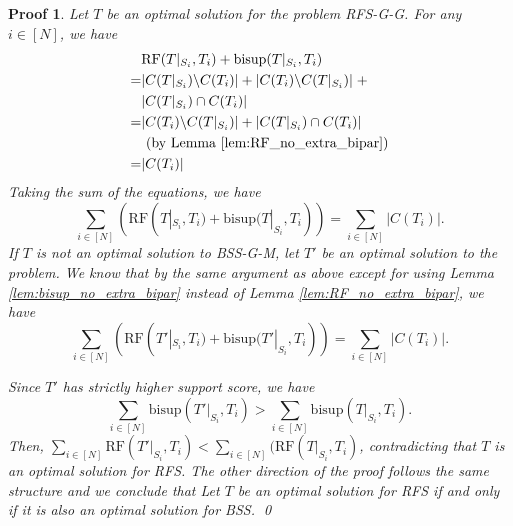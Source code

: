 \documentclass[twocolumn]{bmcart}%
\newcommand{\bs}{\mathrm{bisup}}
\newcommand{\RF}{\mathrm{RF}}
\newcommand{\bss}{\textsc{BSS}\xspace}
\newcommand{\rfs}{\textsc{RFS}\xspace}
\renewcommand{\G}{\textsc{G}\xspace}
\renewcommand{\M}{\textsc{M}\xspace}
\theoremstyle{mystyle}
\theoremstyle{proofstyle}
\newtheorem*{proof2}{Proof}
\newenvironment{proofnospace}{\begin{proof2}}{\qed \end{proof2}}
\begin{document}
\lemEquivalentProblemsGeneral*
\begin{proofnospace}
    Let $T$ be an optimal solution for the problem \rfs-\G-\G.
    For any $i \in [N]$, we have 
    \begin{align*}
        &\RF(T|_{S_i}, T_i) + \bs(T|_{S_i},T_i) \\ 
        =& |C(T|_{S_i})\backslash C(T_i)|   + |C(T_i)\backslash C(T|_{S_i})| \;+ \\   
         & |C(T|_{S_i}) \cap C(T_i)|\\
        =& |C(T_i)\backslash C(T|_{S_i})| + |C(T|_{S_i}) \cap C(T_i)| \\
        &\text{ (by Lemma \ref{lem:RF_no_extra_bipar})}\\
        =& |C(T_i)|
    \end{align*}
  Taking the sum of the equations, we have
  \[
    \sum_{i \in [N]} (\RF(T|_{S_i}, T_i) + \bs(T|_{S_i},T_i)) = \sum_{i \in [N]} |C(T_i)|.
  \]
  If $T$ is not an optimal solution to \bss-\G-\M, let $T'$ be an optimal solution to the problem. We know that by the same argument as above except for using Lemma \ref{lem:bisup_no_extra_bipar} instead of Lemma \ref{lem:RF_no_extra_bipar}, we have
    \[
    \sum_{i \in [N]} (\RF(T'|_{S_i}, T_i) + \bs(T'|_{S_i},T_i)) = \sum_{i \in [N]} |C(T_i)|.
  \]
  
  Since $T'$ has strictly higher support score, we have \[\sum_{i\in [N]}\bs(T'|_{S_i},T_i) > \sum_{i\in [N]}\bs(T|_{S_i},T_i).\] Then, $\sum_{i \in [N]} \RF(T'|_{S_i}, T_i) < \sum_{i \in [N]} (\RF(T|_{S_i}, T_i)$, contradicting that $T$ is an optimal solution for \rfs. The other direction of the proof follows the same structure and we conclude that Let $T$ be an optimal solution for \rfs if and only if it is also an optimal solution for \bss.
\end{proofnospace}
\end{document}
